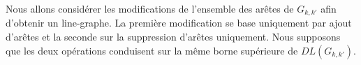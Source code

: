 Nous allons consid\'erer les modifications de l'ensemble des ar\^etes de $G_{k,k'}$ afin d'obtenir un line-graphe. 
La premi\`ere modification  se base uniquement par ajout d'ar\^etes et la seconde sur la suppression d'ar\^etes uniquement. 
Nous supposons que les deux op\'erations conduisent sur la m\^eme borne sup\'erieure de $DL(G_{k,k'})$.




